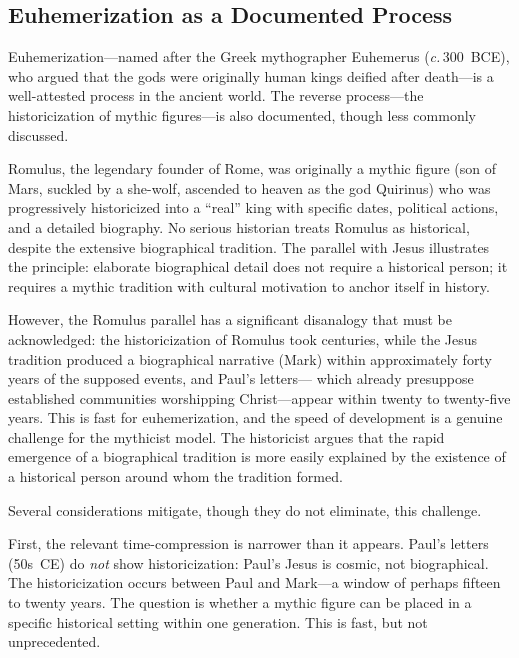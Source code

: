 \documentclass[12pt,oneside]{article}
\newcommand{\circa}{\textit{c.}\,}
\begin{document}
\subsection{Euhemerization as a Documented Process}
\label{sec:trajectory:euhemerization}

Euhemerization---named after the Greek mythographer Euhemerus
(\circa 300~BCE), who argued that the gods were originally human kings
deified after death---is a well-attested process in the ancient world.
The reverse process---the historicization of mythic figures---is also
documented, though less commonly discussed.

Romulus, the legendary founder of Rome, was originally a mythic figure
(son of Mars, suckled by a she-wolf, ascended to heaven as the god
Quirinus) who was progressively historicized into a ``real'' king with
specific dates, political actions, and a detailed biography.  No
serious historian treats Romulus as historical, despite the extensive
biographical tradition.  The parallel with Jesus illustrates the
principle: elaborate biographical detail does not require a historical
person; it requires a mythic tradition with cultural motivation to
anchor itself in history.

However, the Romulus parallel has a significant disanalogy that must be
acknowledged: the historicization of Romulus took centuries, while the
Jesus tradition produced a biographical narrative (Mark) within
approximately forty years of the supposed events, and Paul's letters---
which already presuppose established communities worshipping
Christ---appear within twenty to twenty-five years.  This is fast for
euhemerization, and the speed of development is a genuine challenge for
the mythicist model.  The historicist argues that the rapid emergence of
a biographical tradition is more easily explained by the existence of a
historical person around whom the tradition formed.

Several considerations mitigate, though they do not eliminate, this
challenge.

First, the relevant time-compression is narrower than it appears.
Paul's letters (50s~CE) do \textit{not} show historicization: Paul's
Jesus is cosmic, not biographical.  The historicization occurs between
Paul and Mark---a window of perhaps fifteen to twenty years.  The
question is whether a mythic figure can be placed in a specific
historical setting within one generation.  This is fast, but not
unprecedented.
\end{document}

